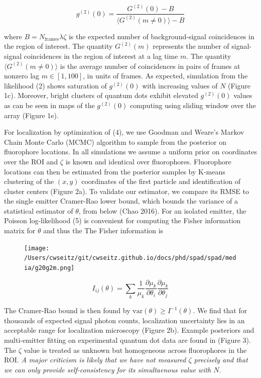 \begin{equation}
g^{(2)}(0) = \frac{G^{(2)}(0)-B}{\langle G^{(2)}(m\neq 0)\rangle -B}
\end{equation}

where $B = N_{\mathrm{frames}}\lambda\zeta$ is the expected number of background-signal coincidences in the region of interest. The quantity $G^{(2)}(m)$ represents the number of signal-signal coincidences in the region of interest at a lag time $m$. The quantity $\langle G^{(2)}(m\neq 0)\rangle$ is the average number of coincidences in pairs of frames at nonzero lag $m \in [1,100]$, in units of frames. As expected, simulation from the likelihood (2) shows saturation of $g^{(2)}(0)$  with increasing values of $N$ (Figure 1c). Moreover, bright clusters of quantum dots exhibit elevated $g^{(2)}(0)$ values as can be seen in maps of the $g^{(2)}(0)$ computing using sliding window over the array (Figure 1e).

For localization by optimization of (4), we use Goodman and Weare's Markov Chain Monte Carlo (MCMC) algorithm \parencite{Goodman2010} to sample from the posterior on fluorophore locations. In all simulations we assume a uniform prior on coordinates over the ROI and $\zeta$ is known and identical over fluorophores. Fluorophore locations can then be estimated from the posterior samples by K-means clustering of the $(x,y)$ coordinates of the first particle and identification of cluster centers (Figure 2a). To validate our estimator, we compare its RMSE to the single emitter Cramer-Rao lower bound, which bounds the variance of a statistical estimator of $\theta$, from below (Chao 2016). For an isolated emitter, the Poisson log-likelihood (5) is convenient for computing the Fisher information matrix for $\theta$ and thus the The Fisher information is \parencite{Smith2010}

\begin{figure}[t]
\centering
\texttt{[image: /Users/cwseitz/git/cwseitz.github.io/docs/phd/spad/spad/media/g20g2m.png]}
\caption{}
\end{figure}   

\begin{equation}
I_{ij}(\theta) = \sum_{k}\frac{1}{\mu_{k}}\frac{\partial \mu_{k}}{\partial\theta_{i}}\frac{\partial \mu_{k}}{\partial\theta_{j}}
\end{equation}

The Cramer-Rao bound is then found by $\mathrm{var}(\theta) \geq I^{-1}(\theta)$. We find that for thousands of expected signal photon counts, localization uncertainty lies in an acceptable range for localization microscopy (Figure 2b). Example posteriors and multi-emitter fitting on experimental quantum dot data are found in (Figure 3). The $\zeta$ value is treated as unknown but homogeneous across fluorophores in the ROI. \textit{A major criticism is likely that we have not measured $\zeta$ precisely and that we can only provide self-consistency for its simultaenous value with $N$}.

